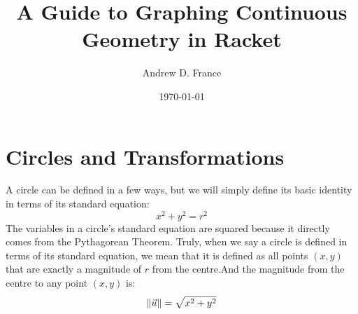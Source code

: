 \documentclass[12pt, letterpaper]{article}
\title{A Guide to Graphing Continuous Geometry in Racket}
\author{Andrew D. France}
\date{\today}
\newcommand{\Lr}{\(r\) }
\newcommand{\xy}{\((x,y)\) }
\begin{document}
	
	\maketitle
	\newpage
	
	\tableofcontents
	\newpage

	\section{Circles and Transformations}
	A circle can be defined in a few ways, but we will simply define its basic identity in terms of its standard equation:
	\begin{equation*}
		x^2 + y^2 = r^2
	\end{equation*}
	The variables in a circle's standard equation are squared because it directly comes from the Pythagorean Theorem. Truly, when we say a circle is defined in terms of its standard equation, we mean that it is defined as all points \xy that are exactly a magnitude of \Lr from the centre.\ftA And the magnitude from the centre to any point \xy is:
	\begin{equation*}
		\left\lVert\vec{u}\right\rVert=\sqrt{x^{2}+y^{2}}
	\end{equation*}
	
\end{document}
